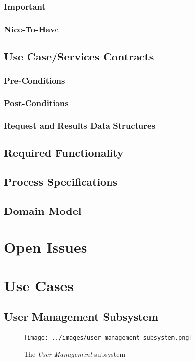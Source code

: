 \documentclass{article}
\begin{document}
		\subsubsection{Important}
		\subsubsection{Nice-To-Have}
	\subsection{Use Case/Services Contracts}
		\subsubsection{Pre-Conditions}
		\subsubsection{Post-Conditions}
		\subsubsection{Request and Results Data Structures}
	\subsection{Required Functionality}
	\subsection{Process Specifications}
	\subsection{Domain Model}

\newpage
\section{Open Issues}

\newpage
\section{Use Cases}
	\subsection{User Management Subsystem}
		\begin{figure}[H]
			\centering
			\texttt{[image: ../images/user-management-subsystem.png]}
			\caption{The \emph{User Management} subsystem}
		\end{figure}
\end{document}
